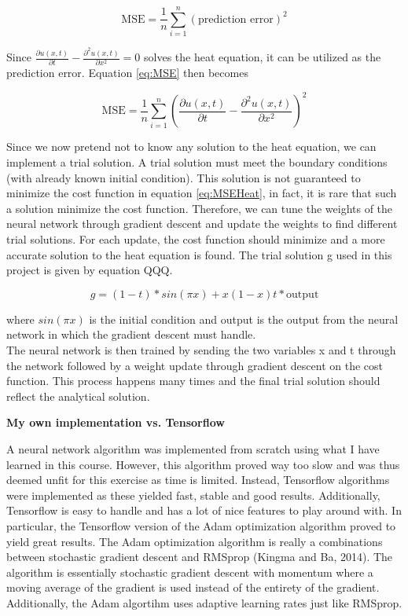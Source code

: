 \documentclass[12pt,a4paper]{article}
\begin{document}
\begin{equation}\label{eq:MSE}
\textrm{MSE} = \frac{1}{n} \sum_{i = 1}^n (\textrm{prediction error})^2
\end{equation}

\noindent Since $\frac{\partial u(x,t)}{\partial t} - \frac{\partial^2 u(x,t)}{\partial x^2} = 0$ solves the heat equation, it can be utilized as the prediction error. Equation \ref{eq:MSE} then becomes

\begin{equation}\label{eq:MSEHeat}
\textrm{MSE} = \frac{1}{n} \sum_{i = 1}^n (\frac{\partial u(x,t)}{\partial t} - \frac{\partial^2 u(x,t)}{\partial x^2})^2
\end{equation}

\noindent Since we now pretend not to know any solution to the heat equation, we can implement a trial solution. A trial solution must meet the boundary conditions (with already known initial condition). This solution is not guaranteed to minimize the cost function in equation \ref{eq:MSEHeat}, in fact, it is rare that such a solution minimize the cost function. Therefore, we can tune the weights of the neural network through gradient descent and update the weights to find different trial solutions. For each update, the cost function should minimize and a more accurate solution to the heat equation is found. The trial solution g used in this project is given by equation QQQ.

\begin{equation}\label{eq:trial}
g = (1-t)*sin(\pi x) + x(1-x)t*\textrm{output}
\end{equation}

\noindent where $sin(\pi x)$ is the initial condition and output is the output from the neural network in which the gradient descent must handle. 
\\
The neural network is then trained by sending the two variables x and t through the network followed by a weight update through gradient descent on the cost function. This process happens many times and the final trial solution should reflect the analytical solution.

\begin{center}
\large{\textbf{My own implementation vs. Tensorflow}}
\end{center}

\noindent A neural network algorithm was implemented from scratch using what I have learned in this course. However, this algorithm proved way too slow and was thus deemed unfit for this exercise as time is limited. Instead, Tensorflow algorithms were implemented as these yielded fast, stable and good results. Additionally, Tensorflow is easy to handle and has a lot of nice features to play around with. In particular, the Tensorflow version of the Adam optimization algorithm proved to yield great results. The Adam optimization algorithm is really a combinations between stochastic gradient descent and RMSprop (Kingma and Ba, 2014). The algorithm is essentially stochastic gradient descent with momentum where a moving average of the gradient is used instead of the entirety of the gradient. Additionally, the Adam algortihm uses adaptive learning rates just like RMSprop. 
\end{document}
